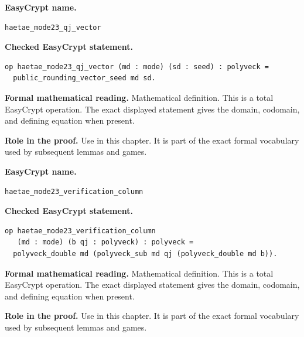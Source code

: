 \begin{formaldefinition}
\noindent\textbf{EasyCrypt name.}
\begin{lstlisting}[language=EasyCrypt,basicstyle=\ttfamily\scriptsize]
haetae_mode23_qj_vector
\end{lstlisting}
\noindent\textbf{Checked EasyCrypt statement.}
\begin{lstlisting}[language=EasyCrypt,basicstyle=\ttfamily\scriptsize]
op haetae_mode23_qj_vector (md : mode) (sd : seed) : polyveck =
  public_rounding_vector_seed md sd.
\end{lstlisting}
\noindent\textbf{Formal mathematical reading.}
Mathematical definition. This is a total EasyCrypt operation.  The exact displayed statement gives the domain, codomain, and defining equation when present.

\noindent\textbf{Role in the proof.}
Use in this chapter. It is part of the exact formal vocabulary used by subsequent lemmas and games.

\end{formaldefinition}

\begin{formaldefinition}
\noindent\textbf{EasyCrypt name.}
\begin{lstlisting}[language=EasyCrypt,basicstyle=\ttfamily\scriptsize]
haetae_mode23_verification_column
\end{lstlisting}
\noindent\textbf{Checked EasyCrypt statement.}
\begin{lstlisting}[language=EasyCrypt,basicstyle=\ttfamily\scriptsize]
op haetae_mode23_verification_column
   (md : mode) (b qj : polyveck) : polyveck =
  polyveck_double md (polyveck_sub md qj (polyveck_double md b)).
\end{lstlisting}
\noindent\textbf{Formal mathematical reading.}
Mathematical definition. This is a total EasyCrypt operation.  The exact displayed statement gives the domain, codomain, and defining equation when present.

\noindent\textbf{Role in the proof.}
Use in this chapter. It is part of the exact formal vocabulary used by subsequent lemmas and games.

\end{formaldefinition}

